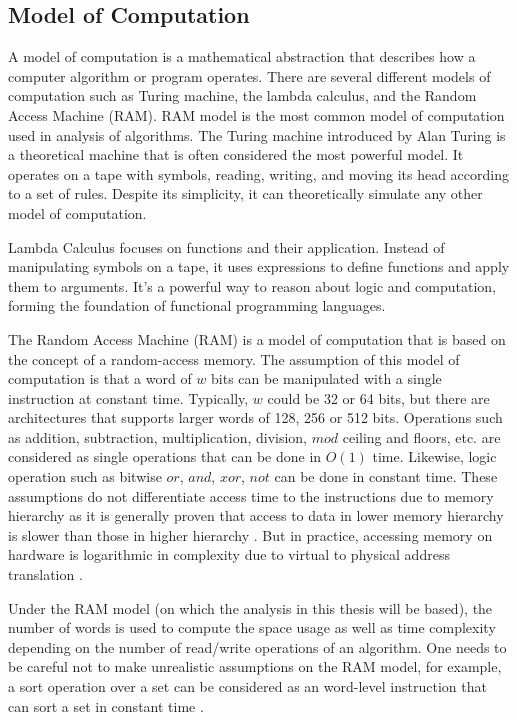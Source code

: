 \subsection{Model of Computation}
A model of computation is a mathematical abstraction that describes how a computer algorithm or program operates. There are several different models of computation such as Turing machine, the lambda calculus, and the Random Access Machine (RAM). RAM model is the most common model of computation used in analysis of algorithms.
\newline \newline
The Turing machine introduced by Alan Turing is a theoretical machine that is often considered the most powerful model. It operates on a tape with symbols, reading, writing, and moving its head according to a set of rules. Despite its simplicity, it can theoretically simulate any other model of computation.\par
Lambda Calculus focuses on functions and their application. Instead of manipulating symbols on a tape, it uses expressions to define functions and apply them to arguments. It's a powerful way to reason about logic and computation, forming the foundation of functional programming languages.\par
The Random Access Machine (RAM) is a model of computation that is based on the concept of a random-access memory. The assumption of this model of computation is that a word of $w$ bits can be manipulated with a single instruction at constant time. Typically, $w$ could be 32 or 64 bits, but there are architectures that supports larger words of 128, 256 or 512 bits. Operations such as addition, subtraction, multiplication, division, $mod$ ceiling and floors, etc. are considered as single operations that can be done in $O(1)$ time. Likewise, logic operation such as bitwise $or$, $and$, $xor$, $not$ can be done in constant time. These assumptions do not differentiate access time to the instructions due to memory hierarchy as it is generally proven that access to data in lower memory hierarchy is slower than those in higher hierarchy \cite{Gog_2013}. But in practice, accessing memory on hardware is logarithmic in complexity due to virtual to physical address translation \cite{Jurkiewicz_2015}.\par
Under the RAM model (on which the analysis in this thesis will be based), the number of words is used to compute the space usage as well as time complexity depending on the number of read/write operations of an algorithm. One needs to be careful not to make unrealistic assumptions on the RAM model, for example, a sort operation over a set can be considered as an word-level instruction that can sort a set in constant time \cite{Cormen_2022}.
